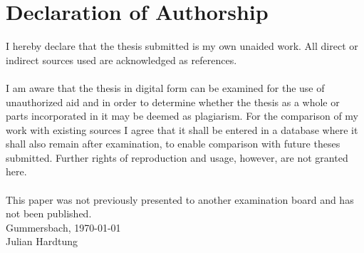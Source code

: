 
\chapter*{Declaration of Authorship}
I hereby declare that the thesis submitted is my own unaided work. All direct or indirect sources used are acknowledged as references.\\ \\
I am aware that the thesis in digital form can be examined for the use of unauthorized aid and in order to determine whether the thesis as a whole or parts incorporated in it may be deemed as plagiarism. For the comparison of my work with existing sources I agree that it shall be entered in a database where it shall also remain
after examination, to enable comparison with future theses submitted. Further rights
of reproduction and usage, however, are not granted here.\\ \\
This paper was not previously presented to another examination board and has not been published.
\vspace{1.5cm}
\\
Gummersbach, \today
\vspace{3cm}
\\
Julian Hardtung



